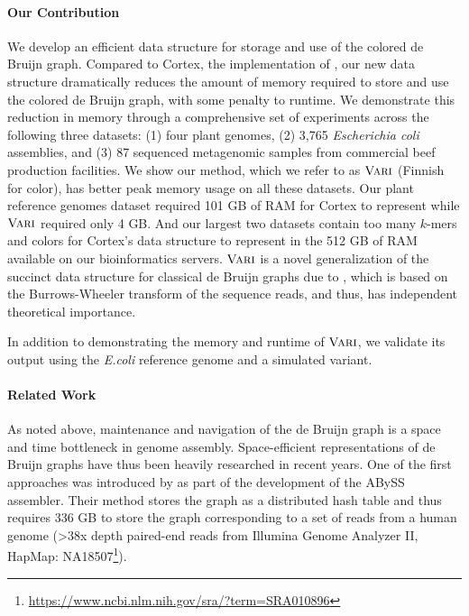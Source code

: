 
\paragraph{Our Contribution}  
We develop an efficient data structure for storage and use of the colored de Bruijn graph. Compared to {\sc Cortex}, the implementation of \cite{ICTFM12}, our new data structure dramatically reduces the amount of memory required to store and use the colored de Bruijn graph, with some penalty to runtime. We demonstrate this reduction in memory through a comprehensive set of experiments across the following three datasets: (1)  four plant genomes, (2) 3,765 {\em Escherichia coli} assemblies,
 and (3) 87 sequenced metagenomic samples from commercial beef production facilities.  We show our method, which we refer to as $\mbox{\rm {\sc Vari}}$ (Finnish for color), has better peak memory usage on all these datasets. Our plant reference genomes dataset required 101 GB of RAM for  {\sc Cortex} to represent while $\mbox{\rm {\sc Vari}}$ required only 4 GB.  And  our
largest two datasets contain too many $k$-mers and colors for {\sc Cortex}'s data structure to represent in the 512 GB of RAM available on our bioinformatics servers. $\mbox{\rm {\sc Vari}}$ is a novel generalization of the succinct data structure for classical de Bruijn graphs due to \cite{BOSS12}, which is based on the Burrows-Wheeler transform of the sequence reads, and thus, has independent theoretical importance.

In addition to demonstrating the memory and runtime of $\mbox{\rm {\sc Vari}}$, we validate its output using the {\em E.coli} reference genome and a simulated variant.


\paragraph{Related Work} As noted above, maintenance and navigation of the de Bruijn graph is a space and time bottleneck in genome assembly. Space-efficient representations of de Bruijn graphs have thus been heavily researched in recent years. One of the first approaches was introduced by \cite{Simpson:2009} as part of the development of the ABySS assembler.  Their method stores the graph as a distributed hash table and thus requires 336 GB to store the graph corresponding to a set of reads from a human genome (>38x depth paired-end reads from Illumina Genome Analyzer II, HapMap: NA18507\footnote{\url{https://www.ncbi.nlm.nih.gov/sra/?term=SRA010896}}). 
 
